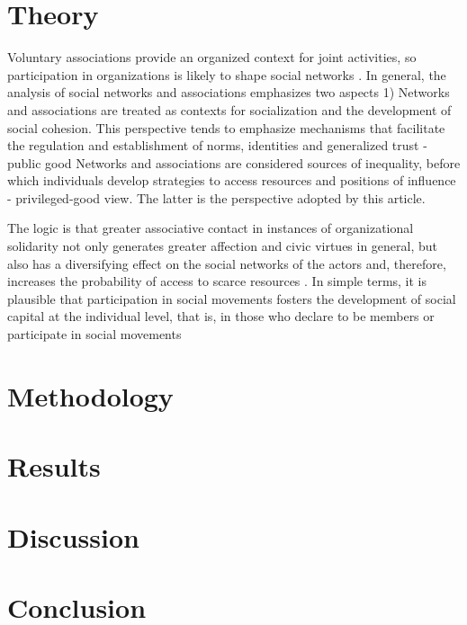 \section{Theory}

Voluntary associations provide an organized context for joint activities, so participation in organizations is likely to shape social networks \parencite{feld_focused_1981,mcpherson_social_1992}. In general, the analysis of social networks and associations emphasizes two aspects 1) Networks and associations are treated as contexts for socialization and the development of social cohesion. This perspective tends to emphasize mechanisms that facilitate the regulation and
establishment of norms, identities and generalized trust \parencite{glanville_voluntary_2004,glanville_why_2016,paxton_association_2007,paxton_trust_2018} - public good Networks and associations are considered sources of inequality, before which individuals develop strategies to access resources and positions of influence \parencite{bekkers_social_2008} - privileged-good view. The latter is the perspective adopted by this article.

\hspace{10pt}

The logic is that greater associative contact in instances of organizational solidarity not only generates greater affection and civic virtues in general, but also has a diversifying effect on the social networks of the actors and, therefore, increases the probability of
access to scarce resources \parencite{diani_social_1997,malinick_network_2013,tindall_network_2012,benton_uniters_2016}. In simple terms, it is plausible that participation in social movements fosters the development of social capital at the individual level, that is, in those who declare to be members or participate in social movements


\section{Methodology}

\section{Results}

\section{Discussion}

\section{Conclusion}
\newpage

\printbibliography



